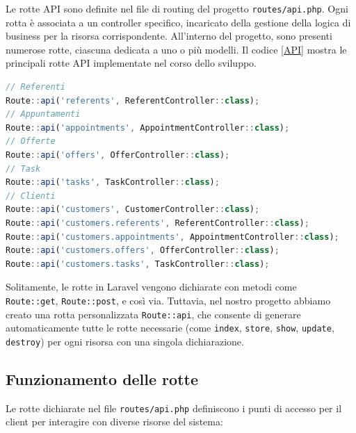 Le rotte API sono definite nel file di routing del progetto \texttt{routes/api.php}. Ogni rotta è associata a un controller specifico, incaricato della gestione della logica di business per la risorsa corrispondente. All'interno del progetto, sono presenti numerose rotte, ciascuna dedicata a uno o più modelli. Il codice \ref{API} mostra le principali rotte API implementate nel corso dello sviluppo.
\begin{lstlisting}[language=JavaScript, numbers=none, label=API, caption=API]
// Referenti
Route::api('referents', ReferentController::class);
// Appuntamenti
Route::api('appointments', AppointmentController::class);
// Offerte
Route::api('offers', OfferController::class);
// Task
Route::api('tasks', TaskController::class);
// Clienti
Route::api('customers', CustomerController::class);
Route::api('customers.referents', ReferentController::class);
Route::api('customers.appointments', AppointmentController::class);
Route::api('customers.offers', OfferController::class);
Route::api('customers.tasks', TaskController::class);
\end{lstlisting}
\pagebreak
Solitamente, le rotte in Laravel vengono dichiarate con metodi come\\
\texttt{Route::get}, \texttt{Route::post}, e così via. Tuttavia, nel nostro progetto abbiamo creato una rotta personalizzata \texttt{Route::api}, che consente di generare automaticamente tutte le rotte necessarie (come \texttt{index}, \texttt{store}, \texttt{show}, \texttt{update}, \texttt{destroy}) per ogni risorsa con una singola dichiarazione.

\subsection{Funzionamento delle rotte}

Le rotte dichiarate nel file \texttt{routes/api.php} definiscono i punti di accesso per il client per interagire con diverse risorse del sistema:

